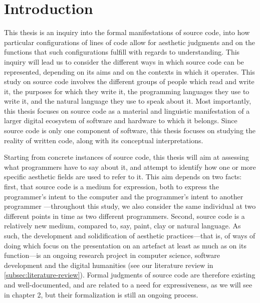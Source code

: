 \chapter{Introduction}
\label{chap:introduction}

This thesis is an inquiry into the formal manifestations of source code, into how particular configurations of lines of code allow for aesthetic judgments and on the functions that such configurations fulfill with regards to understanding. This inquiry will lead us to consider the different ways in which source code can be represented, depending on its aims and on the contexts in which it operates. This study on source code involves the different groups of people which read and write it, the purposes for which they write it, the programming languages they use to write it, and the natural language they use to speak about it. Most importantly, this thesis focuses on source code as a material and linguistic manifestation of a larger digital ecosystem of software and hardware to which it belongs. Since source code is only one component of software, this thesis focuses on studying the reality of written code, along with its conceptual interpretations.

Starting from concrete instances of source code, this thesis will aim at assessing what programmers have to say about it, and attempt to identify how one or more specific aesthetic fields are used to refer to it. This aim depends on two facts: first, that source code is a medium for expression, both to express the programmer's intent to the computer \citep{dijkstra_craftsman_1982} and the programmer's intent to another programmer \citep{abelson_structure_1979}—throughout this study, we also consider the same individual at two different points in time as two different programmers. Second, source code is a relatively new medium, compared to, say, paint, clay or natural language. As such, the development and solidification of aesthetic practices—that is, of ways of doing which focus on the presentation on an artefact at least as much as on its function—is an ongoing research project in computer science, software development and the digital humanities (see our literature review in \autoref{subsec:literature-review}). Formal judgments of source code are therefore existing and well-documented, and are related to a need for expressiveness, as we will see in chapter 2, but their formalization is still an ongoing process.

